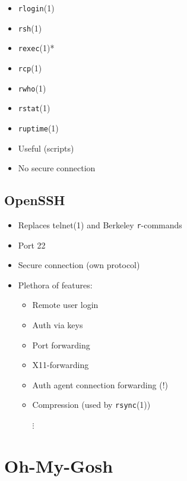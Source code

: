 \documentclass[
	xcolor=dvipsnames,
]{beamer}
\newenvironment{zhawframe}[1][]
{\begin{frame}[environment=fr,#1]{\insertsectionhead}{\insertsubsectionhead}}
{\end{frame}
}
\begin{document}
\begin{zhawframe}
\begin{itemize}
\item<1-> \texttt{rlogin}(1)
\item<2-> \texttt{rsh}(1)
\item<3-> \texttt{rexec}(1)*
\item<4-> \texttt{rcp}(1)
\item<5-> \texttt{rwho}(1)
\item<6-> \texttt{rstat}(1)
\item<7-> \texttt{ruptime}(1)
\end{itemize}
\end{zhawframe}

\begin{zhawframe}
\begin{itemize}
\item<1-> Useful (scripts)
\item<2-> No secure connection
\end{itemize}
\end{zhawframe}

\subsection{OpenSSH}
\begin{zhawframe}
\begin{itemize}
\item<1-> Replaces telnet(1) and Berkeley \texttt{r}-commands
\item<2-> Port 22
\item<3-> Secure connection (own protocol)
\item<4-> Plethora of features:
	\begin{itemize}
	\item Remote user login
	\item Auth via keys
	\item Port forwarding
	\item X11-forwarding
	\item Auth agent connection forwarding (!)
	\item Compression (used by \texttt{rsync}(1))

	\hspace{3mm}$\vdots$
	\end{itemize}
\end{itemize}
\end{zhawframe}

\section{Oh-My-Gosh}
\end{document}
